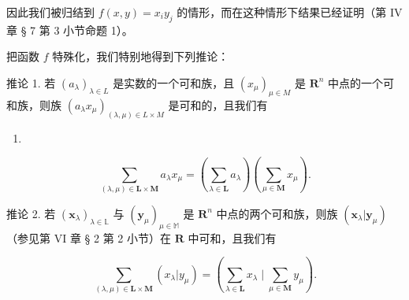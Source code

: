 因此我们被归结到 \(f(x, y) = x_i y_j\) 的情形，而在这种情形下结果已经证明（第 IV 章 § 7 第 3 小节命题 1）。

把函数 \(f\) 特殊化，我们特别地得到下列推论：

推论 1. 若 \((a_{\lambda})_{\lambda \in L}\) 是实数的一个可和族，且 \((x_{\mu})_{\mu \in M}\) 是 \(\mathbf{R}^n\) 中点的一个可和族，则族 \((a_{\lambda}x_{\mu})_{(\lambda, \mu) \in L \times M}\) 是可和的，且我们有

\begin{enumerate}
\def\labelenumi{(\arabic{enumi})}
\setcounter{enumi}{3}
\tightlist
\item
\end{enumerate}

\[
\sum_ {(\lambda , \mu) \in \mathbf {L} \times \mathbf {M}} a _ {\lambda} x _ {\mu} = \left(\sum_ {\lambda \in \mathbf {L}} a _ {\lambda}\right) \left(\sum_ {\mu \in \mathbf {M}} x _ {\mu}\right).
\]

推论 2. 若 \((\pmb{x}_{\lambda})_{\lambda \in \mathbb{L}}\) 与 \((\pmb{y}_{\mu})_{\mu \in \mathbb{M}}\) 是 \(\mathbf{R}^n\) 中点的两个可和族，则族 \((\pmb{x}_{\lambda}|\pmb{y}_{\mu})\) （参见第 VI 章 § 2 第 2 小节）在 \(\mathbf{R}\) 中可和，且我们有

\[
\sum_ {(\lambda , \mu) \in \mathbf {L} \times \mathbf {M}} (x _ {\lambda} | y _ {\mu}) = \left(\sum_ {\lambda \in \mathbf {L}} x _ {\lambda} \mid \sum_ {\mu \in \mathbf {M}} y _ {\mu}\right).\tag{5}
\]

